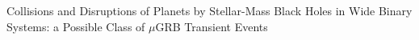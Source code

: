 Collisions and Disruptions of Planets by
  Stellar-Mass Black Holes in Wide Binary Systems: a Possible Class of $\mu$GRB Transient
  Events